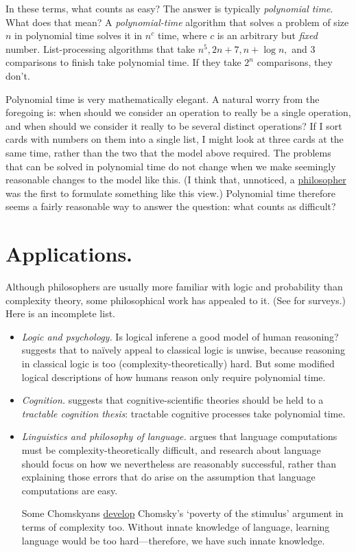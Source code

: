 In these terms, what counts as easy? The answer is typically \emph{polynomial time}. What does that mean? A \emph{polynomial-time} algorithm that solves a problem of size \(n\) in polynomial time solves it in \(n^c\) time, where \(c\) is an arbitrary but \emph{fixed} number. List-processing algorithms that take \(n^5, 2n+7, n+\log n,\) and \(3\) comparisons to finish take polynomial time. If they take \(2^n\) comparisons, they don’t.

Polynomial time is very mathematically elegant. A natural worry from the foregoing is: when should we consider an operation to really be a single operation, and when should we consider it really to be several distinct operations? If I sort cards with numbers on them into a single list, I might look at three cards at the same time, rather than the two that the model above required. The problems that can be solved in polynomial time do not change when we make seemingly reasonable changes to the model like this. (I think that, unnoticed, a \href{https://vignetterie.org/vignettes/invariance.html}{philosopher} was the first to formulate something like this view.) Polynomial time therefore seems a fairly reasonable way to answer the question: what counts as difficult?

\section*{Applications.}
Although philosophers are usually more familiar with logic and probability than complexity theory, some philosophical work has appealed to it. (See \textcites{aaronson2013}{szymanik2018}{vanrooij2019}{dean2021} for surveys.) Here is an incomplete list.
\begin{itemize}
\item \emph{Logic and psychology.} Is logical inferene a good model of human reasoning? \textcite{levesque1988} suggests that to naïvely appeal to classical logic is unwise, because reasoning in classical logic is too (complexity-theoretically) hard. But some modified logical descriptions of how humans reason only require polynomial time.
\item \emph{Cognition.} \textcite{vanrooij2008} suggests that cognitive-scientific theories should be held to a \emph{tractable cognition thesis}: tractable cognitive processes take polynomial time.
\item \emph{Linguistics and philosophy of language.} \textcite[§ 6.2]{ristad1993} argues that language computations must be complexity-theoretically difficult, and research about language should focus on how we nevertheless are reasonably successful, rather than explaining those errors that do arise on the assumption that language computations are easy.

Some Chomskyans \href{https://vignetterie.org/vignettes/thesis-proposal.html}{develop} Chomsky’s ‘poverty of the stimulus’ argument in terms of complexity too. Without innate knowledge of language, learning language would be too hard—therefore, we have such innate knowledge.
\end{itemize}
